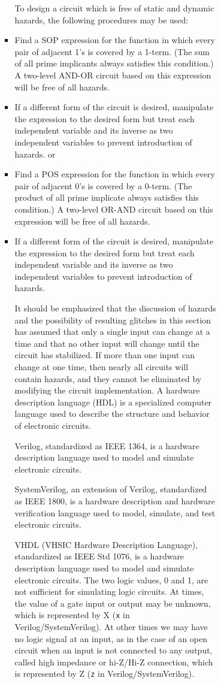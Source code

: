 \documentclass[a4paper,12pt]{article}
\begin{document}
\begin{itemize}
\begin{itemize}
\begin{itemize}
\begin{itemize}
\begin{itemize}
\begin{itemize}
\begin{itemize}
To design a circuit  which is free of static and dynamic hazards, the following procedures may be used:
\ben
\item Find a SOP expression for the function in which every pair of adjacent 1's is covered by a 1-term. (The sum of all prime implicants always satisfies this condition.) A two-level AND-OR circuit based on this expression will be free of all hazards.
\item If a different form of the circuit is desired, manipulate the expression to the desired form but treat each independent variable and its inverse as two independent variables to prevent introduction of hazards.
\een
or
\ben
\item Find a POS expression for the function in which every pair of adjacent 0's is covered by a 0-term. (The product of all prime implicate always satisfies this condition.) A two-level OR-AND circuit based on this expression will be free of all hazards.
\item If a different form of the circuit is desired, manipulate the expression to the desired form but treat each independent variable and its inverse as two independent variables to prevent introduction of hazards.
\een

It should be emphasized that the discussion of hazards and the possibility of resulting glitches in this section has assumed that only a single input can change at a time and that no other input will change until the circuit has stabilized. If more than one input can change at one time, then nearly all circuits will contain hazards, and they cannot be eliminated by modifying the circuit implementation.
A hardware description language (HDL) is a specialized computer language used to describe the structure and behavior of electronic circuits.

Verilog, standardized as IEEE 1364, is a hardware description language used to model and simulate electronic circuits.

SystemVerilog, an extension of Verilog, standardized as IEEE 1800, is a hardware description and hardware verification language used to model, simulate, and test electronic circuits.

VHDL (VHSIC Hardware Description Language), standardized as IEEE Std 1076, is a hardware description language used to model and simulate electronic circuits.
The two logic values, 0 and 1, are not sufficient for simulating logic circuits. At times, the value of a gate input or output may be unknown, which is represented by X (\verb|x| in Verilog/SystemVerilog). At other times we may have no logic signal at an input, as in the case of an open circuit when an input is not connected to any output, called high impedance or hi-Z/Hi-Z connection, which is represented by Z (\verb|z| in Verilog/SystemVerilog).


\end{itemize}
\end{itemize}
\end{itemize}
\end{itemize}
\end{itemize}
\end{itemize}
\end{itemize}
\end{document}
